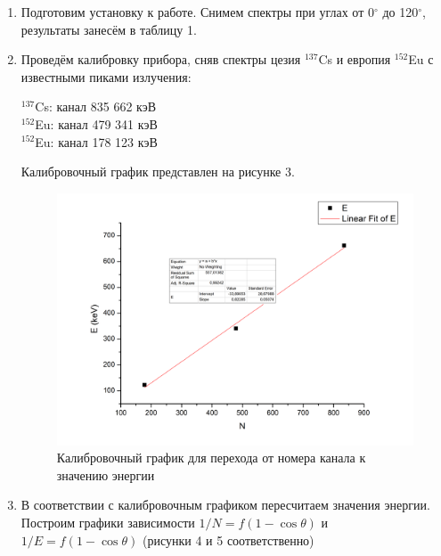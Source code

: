\documentclass[a4paper]{article}
\begin{document}
\begin{enumerate}
    \item Подготовим установку к работе. Снимем спектры при углах от 0$^{\circ}$ до 120$^{\circ}$, результаты занесём в таблицу 1.
    
    \item Проведём калибровку прибора, сняв спектры цезия $^{137}$Cs и европия $^{152}$Eu с известными пиками излучения:
    \begin{center}
        $^{137}$Cs: \hspace{1cm} канал 835 \hspace{1cm}	662 кэВ \\
        $^{152}$Eu: \hspace{1cm} канал 479 \hspace{1cm}	341 кэВ \\
        $^{152}$Eu: \hspace{1cm} канал 178 \hspace{1cm}	123 кэВ
    \end{center}
    
    Калибровочный график представлен на рисунке 3.
    
    \begin{figure}[h]
\begin{center}
\includegraphics[width=12cm]{Calibration.png}
\caption{Калибровочный график для перехода от номера канала к значению энергии}
\label{ris:experimoriginal} %
\end{center}
\end{figure}

    \item В соответствии с калибровочным графиком пересчитаем значения энергии. Построим графики зависимости $1/N = f(1-\cos \theta)$ и $1/E = f(1-\cos \theta)$ (рисунки 4 и 5 соответственно)
    

\end{enumerate}
\end{document}

